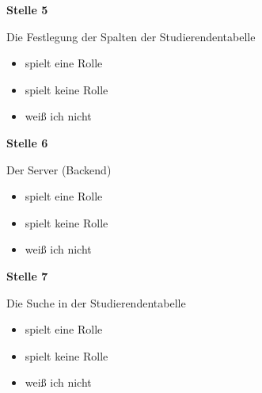 \medskip

\noindent\begin{minipage}{\linewidth}
\textbf{Stelle 5}\par
Die Festlegung der Spalten der Studierendentabelle

\begin{itemize}[nosep,leftmargin=2.4em]
\item[\kreuz] spielt eine Rolle
\item[\kreuz] spielt keine Rolle
\item[\kreuz] weiß ich nicht
\end{itemize}
\end{minipage}

\medskip

\noindent\begin{minipage}{\linewidth}
\textbf{Stelle 6}\par
Der Server (Backend)

\begin{itemize}[nosep,leftmargin=2.4em]
\item[\kreuz] spielt eine Rolle
\item[\kreuz] spielt keine Rolle
\item[\kreuz] weiß ich nicht
\end{itemize}
\end{minipage}

\medskip

\noindent\begin{minipage}{\linewidth}
\textbf{Stelle 7}\par
Die Suche in der Studierendentabelle

\begin{itemize}[nosep,leftmargin=2.4em]
\item[\kreuz] spielt eine Rolle
\item[\kreuz] spielt keine Rolle
\item[\kreuz] weiß ich nicht
\end{itemize}
\end{minipage}

\medskip

